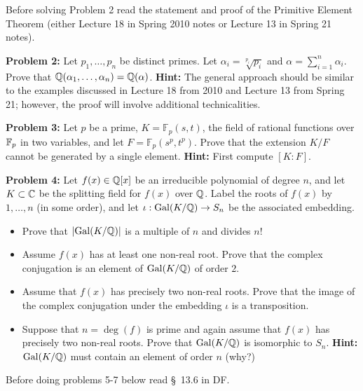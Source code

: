 \documentclass[11pt]{amsart}
\begin{document}
\sk Before solving Problem 2 read the statement and proof of the Primitive Element Theorem (either Lecture 18 in Spring 2010 notes or Lecture 13 in Spring 21 notes).

\skv
{\bf Problem 2:} \rm Let $p_1,\ldots, p_n$ be distinct primes. Let $\alpha_i=\sqrt[p_i]{p_i}$ and $\alpha=\sum\limits_{i=1}^n \alpha_i$. Prove that ${\mathbb Q}(\alpha_1,\ldots,\alpha_n)={\mathbb Q}(\alpha)$. {\bf Hint:} The general approach should be similar to the examples discussed in Lecture 18 from 2010 and Lecture 13 from Spring 21; however, the proof will involve additional technicalities.


\skv
{\bf Problem 3:} \rm Let $p$ be a prime, $K=\mathbb F_p(s,t)$, the field of rational functions over ${\mathbb F}_p$ in two variables, and
let $F=\mathbb F_p(s^p,t^p)$. Prove that the extension $K/F$ cannot be generated by a single element. {\bf Hint:} First compute
$[K:F]$.
\skv

\skv
{\bf Problem 4:} Let $f(x)\in {\mathbb Q}[x]$ be an irreducible polynomial
of degree $n$, and let $K\subset {\mathbb C}$ be the splitting field for $f(x)$ over ${\mathbb Q}$.
Label the roots of $f(x)$ by $1,\ldots, n$ (in some order),
and let $\iota: {\rm Gal}(K/{\mathbb Q})\to S_n$ be the associated embedding.

\begin{itemize}

\item[(a)] Prove that $|{\rm Gal}(K/{\mathbb Q})|$ is a multiple of $n$ and divides $n!$

 \item[(b)] Assume $f(x)$ has at least one non-real root. Prove
that the complex conjugation is an element of ${\rm Gal}(K/{\mathbb Q})$
of order $2$.

\item[(c)] Assume that $f(x)$ has precisely two non-real roots. Prove
that the image of the complex conjugation under the embedding $\iota$
is a transposition.

\item[(d)] Suppose that $n=\deg(f)$ is prime and again assume that $f(x)$ has precisely
two non-real roots. Prove that ${\rm Gal}(K/{\mathbb Q})$ is isomorphic to $S_n$.
{\bf Hint:} ${\rm Gal}(K/{\mathbb Q})$ must contain an element of order $n$ (why?)
\end{itemize}
\newpage
Before doing problems 5-7 below read \S~13.6 in DF.
\end{document}
